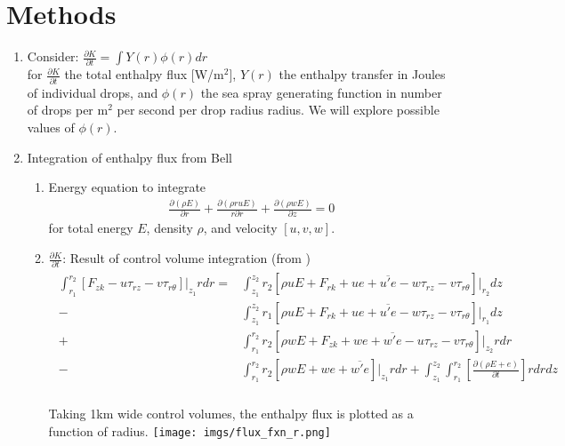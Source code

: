 \documentclass[10pt,a4paper]{article}
\begin{document}
\section{Methods}
\begin{enumerate}
\item Consider: $\frac{\partial K}{\partial t} = \int Y(r)\phi(r) dr\label{eq:Kdt}$\\
for $\frac{\partial K}{\partial t}$ the total enthalpy flux [W/m$^2$], $Y(r)$ the enthalpy transfer in Joules of individual drops, and $\phi(r)$ the sea spray generating function in number of drops per m$^2$ per second per drop radius radius.  We will explore possible values of $\phi(r)$.
\item Integration of enthalpy flux from Bell
\begin{enumerate}
\item Energy equation to integrate\\
\begin{align}
 \frac{\partial (\rho E)}{\partial r} + \frac{\partial (\rho r u E)}{r \partial r}+ \frac{\partial (\rho w E)}{\partial z}=0
\end{align}
for total energy $E$, density $\rho$, and velocity $[u,v,w]$.
\item $\frac{\partial K}{\partial t}$: Result of control volume integration (from \citet{Bell2012})\\
\begin{align}
\begin{split}
\int_{r_1}^{r_2} [F_{zk}- u\tau_{rz} - v\tau_{r\theta}]\bigg\rvert_{z_1}rdr =& \int_{z_1}^{z_2} r_2[\rho u E + F_{rk} + ue + \overline{u'e} - w\tau_{rz} - v\tau_{r\theta}]\bigg\rvert_{r_2}dz\\
-& \int_{z_1}^{z_2} r_1[\rho u E + F_{rk} + ue + \overline{u'e} - w\tau_{rz} - v\tau_{r\theta}]\bigg\rvert_{r_1}dz\\
+& \int_{r_1}^{r_2} r_2[\rho w E + F_{zk} + we + \overline{w'e} - u\tau_{rz} - v\tau_{r\theta}]\bigg\rvert_{z_2}rdr\\
-& \int_{r_1}^{r_2} r_2[\rho w E + we + \overline{w'e} ]\bigg\rvert_{z_1}rdr + \int_{z_1}^{z_2}\int_{r_1}^{r_2}\left[\frac{\partial (\rho E + e)}{\partial t}\right]rdrdz\\\label{eq:NetEFlux}
\end{split}
\end{align}
\begin{center}
Taking 1km wide control volumes, the enthalpy flux is plotted as a function of radius.
\hspace*{-1in}\texttt{[image: imgs/flux\_fxn\_r.png]}\\

\end{center}
\end{enumerate}
\end{enumerate}
\end{document}
